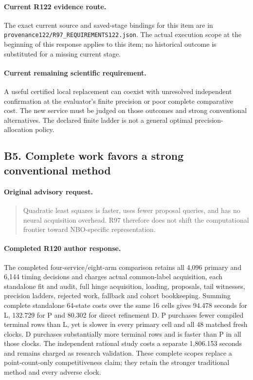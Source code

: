 \paragraph{Current R122 evidence route.}
The exact current source and saved-stage bindings for this item are in \nolinkurl{provenance122/R97_REQUIREMENTS122.json}. The actual execution scope at the beginning of this response applies to this item; no historical outcome is substituted for a missing current stage.
\paragraph{Current remaining scientific requirement.}
A useful certified local replacement can coexist with unresolved independent confirmation at the evaluator's finite precision or poor complete comparative cost. The new service must be judged on those outcomes and strong conventional alternatives. The declared finite ladder is not a general optimal precision-allocation policy.

\subsection{B5. Complete work favors a strong conventional method}
\label{response122:B5}

\paragraph{Original advisory request.}
\begin{quote}
Quadratic least squares is faster, uses fewer proposal queries, and has no neural acquisition overhead. R97 therefore does not shift the computational frontier toward NBO-specific representation.
\end{quote}

\paragraph{Completed R120 author response.}
The completed four-service/eight-arm comparison retains all 4,096 primary and 6,144 timing decisions and charges actual common-label acquisition, each standalone fit and audit, full hinge acquisition, loading, proposals, tail witnesses, precision ladders, rejected work, fallback and cohort bookkeeping. Summing complete standalone 64-state costs over the same 16 cells gives 94.478 seconds for L, 132.729 for P and 80.302 for direct refinement D. P purchases fewer compiled terminal rows than L, yet is slower in every primary cell and all 48 matched fresh clocks. D purchases substantially more terminal rows and is faster than P in all those clocks. The independent rational study costs a separate 1,806.153 seconds and remains charged as research validation. These complete scopes replace a point-count-only competitiveness claim; they retain the stronger traditional method and every adverse clock.

